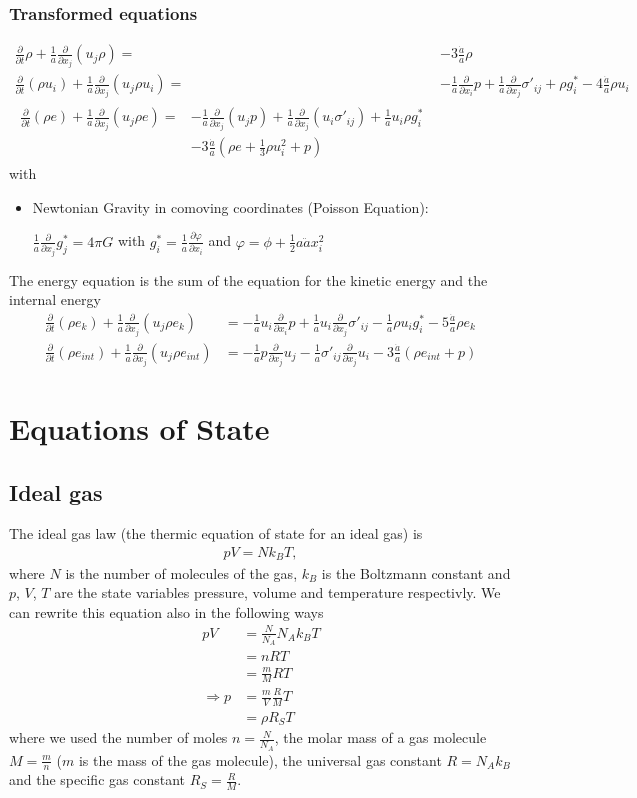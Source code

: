 \documentclass[a4paper,
					12pt,
					twoside,
					openright
					]{book}
\newcommand{\pd}[1]{\frac{\partial}{\partial #1}}
\newcommand{\fa}{\frac{1}{a}}
\newcommand{\fh}{\frac{\dot{a}}{a}}
\begin{document}
\subsection{Transformed equations}
\begin{align}
\pd{t}\rho + \fa\pd{x_j}(u_j \rho) =& -3\fh\rho  \\
\pd{t}(\rho u_i) + \fa\pd{x_j}(u_j \rho u_i) =& 
-\fa\pd{x_i}p + \fa\pd{x_j}\sigma'_{ij} +\rho g^*_i -4\fh \rho u_i
\label{eq:commom}
\\
\begin{split}
\pd{t}(\rho e) + \fa\pd{x_j}(u_j \rho e) =& 
-\fa\pd{x_j}(u_j p) + \fa\pd{x_j}(u_i \sigma'_{ij}) + \fa u_i \rho g^*_i \\ 
&- 3 \fh(\rho e +\frac{1}{3}\rho u^2_i+p)\label{eq:cometot}
\end{split}
\end{align}
with
\begin{itemize}
\item Newtonian Gravity in comoving coordinates (Poisson Equation):
 
$\fa\pd{x_j}g^*_j=4\pi G$
with
$g_i^*=\fa\frac{\partial \varphi}{\partial x_i}$ and
$\varphi=\phi+\frac{1}{2}a\ddot{a}x_i^2$
\end{itemize}
The energy equation is the sum of the equation for the kinetic energy and the
internal energy
\begin{align}
\pd{t}(\rho e_k)+\fa\pd{x_j}(u_j \rho e_k) &= -\fa u_i \pd{x_i}p
+\fa u_i \pd{x_j}\sigma'_{ij}-\fa\rho u_i g^*_i-5\fh\rho e_k\\
\pd{t}(\rho e_{int})+\fa\pd{x_j}(u_j \rho e_{int})&=
-\fa p \pd{x_j}u_j -\fa \sigma'_{ij}\pd{x_j}u_i- 3\fh(\rho e_{int} +p)
\end{align}

\newpage
\appendix
\chapter{Equations of State} \label{eos}
\section{Ideal gas}
The ideal gas law (the thermic equation of state for an ideal gas)
is
\begin{align}
p V = N k_B T, \label{eq:igl}
\end{align}
where $N$ is the number of molecules of the gas, $k_B$ is the Boltzmann
constant and $p$, $V$, $T$ are the state variables pressure, volume and
temperature respectivly. We can rewrite this equation also in the following 
ways
\begin{align*}
p V &= \frac{N}{N_A} N_A k_B  T \\ 
	 &= n R T \\
    &= \frac{m}{M} R T \\
\Rightarrow p &= \frac{m}{V} \frac{R}{M} T \\
              &= \rho R_S T
\end{align*}
where we used the number of moles $n=\frac{N}{N_A}$, 
the molar mass of a gas molecule $M = \frac{m}{n}$ ($m$ is the
mass of the gas molecule), the universal gas constant $R= N_A k_B$ and the
specific gas constant $R_S=\frac{R}{M}$.
\end{document}
